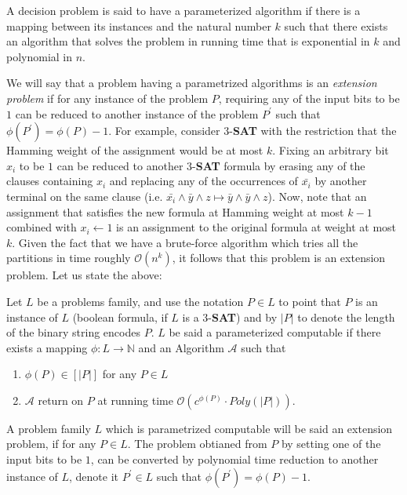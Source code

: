 \documentclass[manuscript,screen,review]{acmart}
\begin{document}
A decision problem is said to have a parameterized algorithm if there is a mapping between its instances and the natural number $k$ such that there exists an algorithm that solves the problem in running time that is exponential in $k$ and polynomial in $n$. 

We will say that a problem having a parametrized algorithms is an \emph{extension problem} if for any instance of the problem $P$, requiring any of the input bits to be $1$ can be reduced to another instance of the problem $P^{\prime}$ such that $\phi\left( P^{\prime} \right) = \phi\left( P \right) - 1$. For example, consider $3$-\textbf{SAT} with the restriction that the Hamming weight of the assignment would be at most $k$. Fixing an arbitrary bit $x_{i}$ to be $1$ can be reduced to another $3$-\textbf{SAT} formula by erasing any of the clauses containing $x_{i}$ and replacing any of the occurrences of $\bar{x_{i}}$ by another terminal on the same clause (i.e. $ \bar{x_{i}} \wedge  \bar{y} \wedge z  \mapsto  \bar{y} \wedge \bar{y} \wedge z$). Now, note that an assignment that satisfies the new formula at Hamming weight at most $k-1$ combined with $x_{i} \leftarrow 1$ is an assignment to the original formula at weight at most $k$. Given the fact that we have a brute-force algorithm which tries all the partitions in time roughly $\mathcal{O}\left( n^{k} \right)$, it follows that this problem is an extension problem. Let us state the above:

\begin{definition} 
  Let $L$ be a problems family, and use the notation $P \in L$ to point that $P$ is an instance of $L$ (boolean formula, if $L$ is a $3$-\textbf{SAT}) and by $|P|$ to denote the length of the binary string encodes $P$. $L$ be said a parameterized computable if there exists a mapping $\phi : L \rightarrow \mathbb{N}$ and an Algorithm $\mathcal{A}$ such that

  \begin{enumerate}
    \item $\phi(P) \in [|P|]$ for any $P\in L$
    \item $\mathcal{A}$ return on $P$ at running time $\mathcal{O}\left(c^{\phi(P)} \cdot Poly(|P|) \right)$. 
  \end{enumerate}
\end{definition}

\begin{definition}
  A problem family $L$ which is parametrized computable will be said an extension problem, if for any $P \in L$. The problem obtianed from $P$ by setting one of the input bits to be $1$, can be converted by polynomial time reduction to another instance of $L$, denote it $P^{\prime} \in L$ such that $\phi\left( P^{\prime} \right) = \phi\left( P \right) -1$. 
\end{definition}
\end{document}
